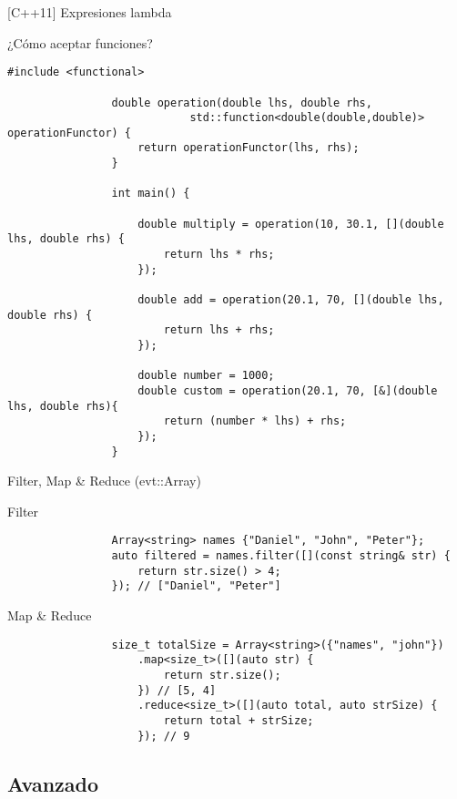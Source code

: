 \documentclass{beamer}
\newcommand{\normalSizeItem}[1] {
  \normalsize{\item #1}
}
\newcommand{\newFrameWithoutIndex}[1]{
	\begin{frame}
		#1
		\thispagestyle{empty}
	\end{frame}
}
\newcommand{\newSectionWithoutIndex}[1]{
	\newFrameWithoutIndex{\section{#1}}
}
\newcommand{\smallCite}[1]{
	\begin{small}
		\cite{#1}	
	\end{small}
}
\begin{document}
		\begin{frame}[fragile]{[C++11] Expresiones lambda \lambda}			
			\begin{itemize}				
				\normalSizeItem { ¿Cómo aceptar funciones? }
				\begin{lstlisting}[basicstyle={\tiny\ttfamily}]
				#include <functional>
				
				double operation(double lhs, double rhs, 
							std::function<double(double,double)> operationFunctor) {
					return operationFunctor(lhs, rhs);
				}
				
				int main() {
				
					double multiply = operation(10, 30.1, [](double lhs, double rhs) {
						return lhs * rhs;
					});
					
					double add = operation(20.1, 70, [](double lhs, double rhs) {
						return lhs + rhs;
					});
					
					double number = 1000;
					double custom = operation(20.1, 70, [&](double lhs, double rhs){
						return (number * lhs) + rhs;
					});
				}
				\end{lstlisting}
				
			\end{itemize}
		\end{frame}
		
		\begin{frame}[fragile]{Filter, Map \& Reduce (evt::Array)\smallCite{Array}}	
		
			\begin{itemize}
				\normalSizeItem { Filter }
				\begin{lstlisting}
				Array<string> names {"Daniel", "John", "Peter"};
				auto filtered = names.filter([](const string& str) {
					return str.size() > 4;
				}); // ["Daniel", "Peter"]
				\end{lstlisting}
				
				\normalSizeItem { Map \& Reduce }
				\begin{lstlisting}
				size_t totalSize = Array<string>({"names", "john"})
				    .map<size_t>([](auto str) {
					    return str.size();
				    }) // [5, 4]
				    .reduce<size_t>([](auto total, auto strSize) {
					    return total + strSize; 
				    }); // 9
				\end{lstlisting}
			\end{itemize}
		\end{frame}

		\newSectionWithoutIndex{Avanzado}
	
\end{document}
